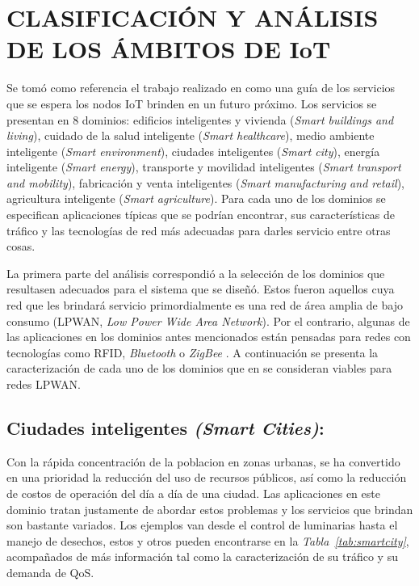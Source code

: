 
\section{CLASIFICACIÓN Y ANÁLISIS DE LOS ÁMBITOS DE IoT}

Se tomó como referencia el trabajo realizado en \parencite{NetTrafficIoT} como una guía de los servicios que se espera los nodos IoT brinden en un futuro próximo. Los servicios se presentan en 8 dominios: edificios inteligentes y vivienda (\textit{Smart buildings and living}), cuidado de la salud inteligente (\textit{Smart healthcare}), medio ambiente inteligente (\textit{Smart environment}), ciudades inteligentes (\textit{Smart city}), energía inteligente (\textit{Smart energy}), transporte y movilidad  inteligentes (\textit{Smart transport and mobility}), fabricación y venta inteligentes (\textit{Smart manufacturing and retail}), agricultura inteligente (\textit{Smart agriculture}). Para cada uno de los dominios se especifican aplicaciones típicas que se podrían encontrar, sus características de tráfico y las tecnologías de red más adecuadas para darles servicio entre otras cosas.\newline

La primera parte del análisis correspondió a la selección de los dominios que resultasen adecuados para el sistema que se diseñó. Estos fueron aquellos cuya red que les brindará servicio primordialmente es una red de área amplia de bajo consumo (LPWAN, \textit{Low Power Wide Area Network}). Por el contrario, algunas de las aplicaciones en los dominios antes mencionados están pensadas para redes con tecnologías como RFID, \textit{Bluetooth }o \textit{ZigBee }. A continuación se presenta la caracterización de cada uno de los dominios que en \parencite{NetTrafficIoT} se consideran viables para redes LPWAN.

\subsection{Ciudades inteligentes \textit{(Smart Cities)}:}

Con la rápida concentración de la poblacion en zonas urbanas, se ha convertido en una prioridad la reducción del uso de recursos públicos, así como la reducción de costos de operación del día a día de una ciudad. Las aplicaciones en este dominio tratan justamente de abordar estos problemas y los servicios que brindan son bastante variados. Los ejemplos van desde el control de luminarias hasta el manejo de desechos, estos y otros  pueden encontrarse en la \textit{Tabla~\ref{tab:smartcity}}, acompañados de más información tal como la caracterización de su tráfico y su demanda de QoS.


